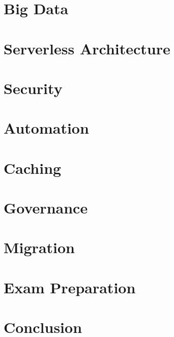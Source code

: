 \documentclass{article} %
\begin{document}
\section{Big Data}
\section{Serverless Architecture}
\section{Security}
\section{Automation}
\section{Caching}
\section{Governance}
\section{Migration}
\section{Exam Preparation}
\section{Conclusion}
\end{document}
